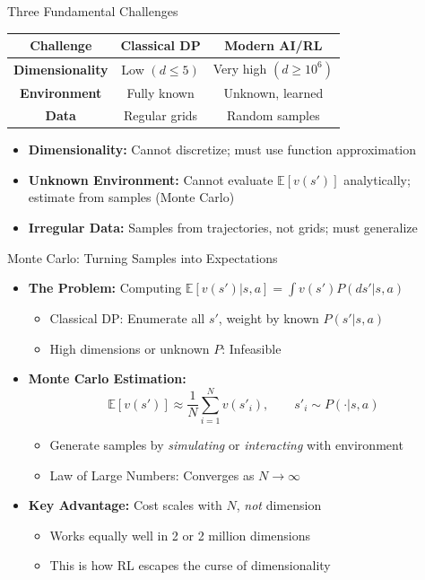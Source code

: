 \begin{frame}{Three Fundamental Challenges}
\begin{center}
\renewcommand{\arraystretch}{1.4}
\begin{tabular}{|c|c|c|}
\hline
\textbf{Challenge} & \textbf{Classical DP} & \textbf{Modern AI/RL} \\
\hline
\textbf{Dimensionality} & Low $(d \leq 5)$ & Very high $(d \geq 10^6)$ \\
\hline
\textbf{Environment} & Fully known & Unknown, learned \\
\hline
\textbf{Data} & Regular grids & Random samples \\
\hline
\end{tabular}
\end{center}

\bigskip
\begin{itemize}
\item \textbf{Dimensionality:} Cannot discretize; must use function approximation
\item \textbf{Unknown Environment:} Cannot evaluate $\mathbb{E}[v(s')]$ analytically; estimate from samples (Monte Carlo)
\item \textbf{Irregular Data:} Samples from trajectories, not grids; must generalize
\end{itemize}
\end{frame}

\begin{frame}{Monte Carlo: Turning Samples into Expectations}
\begin{itemize}
\item \textbf{The Problem:} Computing $\mathbb{E}[v(s') | s, a] = \int v(s') P(ds'|s, a)$
\begin{itemize}
    \item Classical DP: Enumerate all $s'$, weight by known $P(s'|s, a)$
    \item High dimensions or unknown $P$: Infeasible
\end{itemize}

\medskip
\item \textbf{Monte Carlo Estimation:}
\[
\mathbb{E}[v(s')] \approx \frac{1}{N} \sum_{i=1}^{N} v(s'_i), \qquad s'_i \sim P(\cdot | s, a)
\]
\begin{itemize}
    \item Generate samples by \emph{simulating} or \emph{interacting} with environment
    \item Law of Large Numbers: Converges as $N \to \infty$
\end{itemize}

\medskip
\item \textbf{Key Advantage:} Cost scales with $N$, \emph{not} dimension
\begin{itemize}
    \item Works equally well in 2 or 2 million dimensions
    \item This is how RL escapes the curse of dimensionality
\end{itemize}
\end{itemize}
\end{frame}


